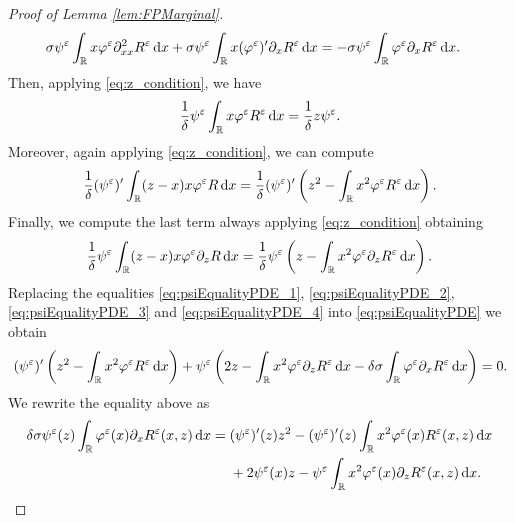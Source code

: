 \documentclass[10pt]{article}
\begin{document}
\begin{appendices}
\begin{proof}[Proof of Lemma \ref{lem:FPMarginal}]
\begin{equation}
	\begin{aligned}
	\sigma \psi^\varepsilon \int_{\mathbb{R}}  x \varphi^\varepsilon \partial^2_{xx} R^\varepsilon \,\mathrm{d} x+ \sigma \psi^\varepsilon \int_{\mathbb{R}} x (\varphi^\varepsilon)' \partial_x R^\varepsilon \,\mathrm{d} x &= -\sigma \psi^\varepsilon \int_{\mathbb{R}} \varphi^\varepsilon \partial_x R^\varepsilon \,\mathrm{d} x.
	\end{aligned}
	\end{equation}
	Then, applying \eqref{eq:z_condition}, we have
	\begin{equation}\label{eq:psiEqualityPDE_2}
	\frac1\delta \psi^\varepsilon \int_{\mathbb{R}} x \varphi^\varepsilon  R^\varepsilon \,\mathrm{d} x = \frac1\delta z \psi^\varepsilon.
	\end{equation}
	Moreover, again applying \eqref{eq:z_condition}, we can compute
	\begin{equation}\label{eq:psiEqualityPDE_3}
	\begin{aligned}
	\frac1\delta (\psi^\varepsilon)' \int_{\mathbb{R}} (z-x)x \varphi^\varepsilon  R \,\mathrm{d} x = \frac1\delta (\psi^\varepsilon)' \left(z^2 - \int_{\mathbb{R}} x^2 \varphi^\varepsilon R^\varepsilon \,\mathrm{d} x\right).
	\end{aligned}
	\end{equation}
	Finally, we compute the last term always applying \eqref{eq:z_condition} obtaining
	\begin{equation}\label{eq:psiEqualityPDE_4}
	\frac1\delta \psi^\varepsilon \int_{\mathbb{R}} (z-x)x \varphi^\varepsilon \partial_z R \,\mathrm{d} x = \frac1\delta \psi^\varepsilon\left(z - \int_{\mathbb{R}} x^2 \varphi^\varepsilon \partial_z R^\varepsilon \,\mathrm{d} x\right).
	\end{equation}
	Replacing the equalities \eqref{eq:psiEqualityPDE_1}, \eqref{eq:psiEqualityPDE_2}, \eqref{eq:psiEqualityPDE_3} and \eqref{eq:psiEqualityPDE_4} into \eqref{eq:psiEqualityPDE} we obtain
	\begin{equation}
	(\psi^\varepsilon)' \left ( z^2 - \int_{\mathbb{R}} x^2 \varphi^\varepsilon R^\varepsilon \,\mathrm{d} x \right ) + \psi^\varepsilon \left ( 2z - \int_{\mathbb{R}} x^2 \varphi^\varepsilon \partial_z R^\varepsilon \,\mathrm{d} x - \delta \sigma \int_{\mathbb{R}} \varphi^\varepsilon \partial_x R^\varepsilon \,\mathrm{d} x \right ) = 0.
	\end{equation}
	We rewrite the equality above as
	\begin{equation} \label{eq:psiEquality}
	\delta \sigma \psi^\varepsilon(z) \int_{\mathbb{R}} \varphi^\varepsilon(x) \partial_x R^\varepsilon(x, z) \,\mathrm{d} x = 
	\begin{aligned}[t] &(\psi^\varepsilon)'(z) z^2 - (\psi^\varepsilon)'(z) \int_{\mathbb{R}} x^2 \varphi^\varepsilon(x) R^\varepsilon(x, z) \,\mathrm{d} x \\
	& + 2 \psi^\varepsilon(x) z - \psi^\varepsilon \int_{\mathbb{R}} x^2 \varphi^\varepsilon(x) \partial_z R^\varepsilon(x, z) \,\mathrm{d} x.
	\end{aligned}
	\end{equation}

\end{proof}
\end{appendices}
\end{document}
